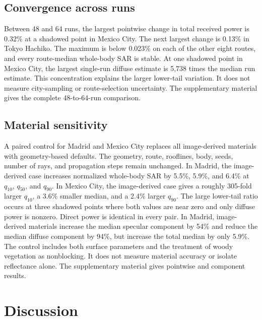 \documentclass{IEEEoj}
\begin{document}
\subsection{Convergence across runs}
\label{sec:convergence}

Between 48 and 64 runs, the largest pointwise change in total received power is
0.32\% at a shadowed point in Mexico City. The next largest change is 0.13\% in
Tokyo Hachiko. The maximum is below 0.023\% on each of the other eight routes,
and every route-median whole-body SAR is stable. At one shadowed point in Mexico
City, the largest single-run diffuse estimate is 5,738 times the median run estimate. This
concentration explains the larger lower-tail variation. It does not measure
city-sampling or route-selection uncertainty. The supplementary material gives
the complete 48-to-64-run comparison.

\subsection{Material sensitivity}
\label{sec:material-sensitivity}

A paired control for Madrid and Mexico City replaces all image-derived
materials with geometry-based defaults. The geometry, route, rooflines, body,
seeds, number of rays, and propagation steps remain unchanged. In Madrid, the
image-derived case increases normalized whole-body SAR by 5.5\%, 5.9\%, and
6.4\% at $q_{10}$, $q_{50}$, and $q_{90}$. In Mexico City, the image-derived case gives a roughly
305-fold larger $q_{10}$, a 3.6\% smaller median, and a 2.4\% larger $q_{90}$.
The large lower-tail ratio occurs at three shadowed points where both values are
near zero and only diffuse power is nonzero. Direct power is identical in every
pair. In Madrid, image-derived materials increase the median specular component
by 54\% and reduce the median diffuse component by 94\%, but increase the total
median by only 5.9\%. The control includes both surface parameters and the
treatment of woody vegetation as nonblocking. It does not measure material
accuracy or isolate reflectance alone. The supplementary material gives
pointwise and component results.

\section{Discussion}
\label{sec:discussion}
\end{document}
